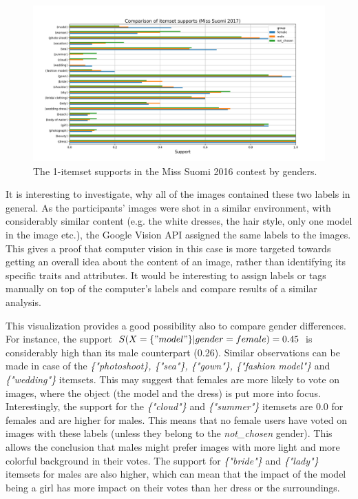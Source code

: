 \begin{figure}[h] 
    \begin{center}
        \includegraphics[width=1.0\textwidth]{Images/itemset_supports-gender-Miss_Helsinki-1_itemset.png}
        \caption{The 1-itemset supports in the Miss Suomi 2016 contest by genders.}
        \label{itemset_supports-gender-Miss_Helsinki-1_itemset}
    \end{center}
\end{figure}

It is interesting to investigate, why all of the images contained these two labels in general. As the participants' images were shot in a similar environment, with considerably similar content (e.g. the white dresses, the hair style, only one model in the image etc.), the Google Vision API assigned the same labels to the images. This gives a proof that computer vision in this case is more targeted towards getting an overall idea about the content of an image, rather than identifying its specific traits and attributes. It would be interesting to assign labels or tags manually on top of the computer's labels and compare results of a similar analysis.

This visualization provides a good possibility also to compare gender differences. For instance, the support $S(X=\{"model"\}|gender=female)=0.45$ is considerably high than its male counterpart (0.26). Similar observations can be made in case of the \textit{\{"photo\:shoot\}, \{"sea"\}, \{"gown"\}, \{"fashion model"\}} and \textit{\{"wedding"\}} itemsets. This may suggest that females are more likely to vote on images, where the object (the model and the dress) is put more into focus. Interestingly, the support for the \textit{\{"cloud"\}} and \textit{\{"summer"\}} itemsets are 0.0 for females and are higher for males. This means that no female users have voted on images with these labels (unless they belong to the \textit{not\_chosen} gender). This allows the conclusion that males might prefer images with more light and more colorful background in their votes. The support for \textit{\{"bride"\}} and \textit{\{"lady"\}} itemsets for males are also higher, which can mean that the impact of the model being a girl has more impact on their votes than her dress or the surroundings.


